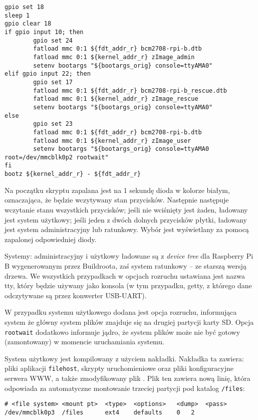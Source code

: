 \documentclass[10pt,a4paper]{article}
\begin{document}
\begin{lstlisting}[caption=Zawartość skryptu uruchomieniowego]
gpio set 18
sleep 1
gpio clear 18
if gpio input 10; then
        gpio set 24
        fatload mmc 0:1 ${fdt_addr_r} bcm2708-rpi-b.dtb
        fatload mmc 0:1 ${kernel_addr_r} zImage_admin
        setenv bootargs "${bootargs_orig} console=ttyAMA0"
elif gpio input 22; then
        gpio set 17
        fatload mmc 0:1 ${fdt_addr_r} bcm2708-rpi-b_rescue.dtb
        fatload mmc 0:1 ${kernel_addr_r} zImage_rescue
        setenv bootargs "${bootargs_orig} console=ttyAMA0"
else
        gpio set 23
        fatload mmc 0:1 ${fdt_addr_r} bcm2708-rpi-b.dtb
        fatload mmc 0:1 ${kernel_addr_r} zImage_user
        setenv bootargs "${bootargs_orig} console=ttyAMA0 root=/dev/mmcblk0p2 rootwait"
fi
bootz ${kernel_addr_r} - ${fdt_addr_r}
\end{lstlisting}
Na początku skryptu zapalana jest na 1 sekundę dioda w kolorze białym, oznaczająca, że będzie
wczytywany stan przycisków. Następnie następuje wczytanie stanu wszystkich przycisków; jeśli
nie wciśnięty jest żaden, ładowany jest system użytkowy; jeśli jeden z dwóch dolnych
przycisków płytki, ładowany jest system administracyjny lub ratunkowy. Wybór jest wyświetlany
za pomocą zapalonej odpowiedniej diody.

Systemy: administracyjny i użytkowy ładowane są z \emph{device tree} dla Raspberry Pi B
wygenerowanym przez Buildroota, zaś system ratunkowy -- ze starszą wersją drzewa.
We wszystkich przypadkach w opcjach rozruchu ustawiana jest nazwa tty, który będzie używany
jako konsola (w tym przypadku, getty, z którego dane odczytywane są przez konwerter USB-UART).

W przypadku systemu użytkowego dodana jest opcja rozruchu, informująca system że główny
system plików znajduje się na drugiej partycji karty SD. Opcja \texttt{rootwait} dodatkowo
informuje jądro, że system plików może nie być gotowy (zamontowany) w momencie uruchamiania
systemu.

System użytkowy jest kompilowany z użyciem nakładki. Nakładka ta zawiera: pliki aplikacji
\texttt{filehost}, skrypty uruchomieniowe oraz pliki konfiguracyjne serwera WWW, a także
zmodyfikowany plik . Plik ten zawiera nową linię, która odpowiada
za automatyczne montowanie trzeciej partycji pod katalog \texttt{/files}:
\begin{lstlisting}[caption=Linia dodana do pliku \directory{/etc/fstab}]
# <file system>	<mount pt>	<type>	<options>	<dump>	<pass>
/dev/mmcblk0p3	/files		ext4	defaults	0	2
\end{lstlisting}
\end{document}

